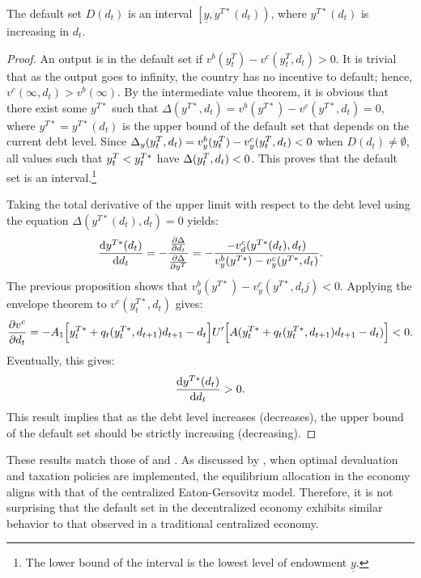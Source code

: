 \begin{proposition}
    \label{prop3}
    The default set $D(d_t)$ is an interval $\left[\underline{y}, y^{T*}(d_t) \right)$, where $y^{T*}(d_t)$ is increasing in $d_t$.
\end{proposition}
\begin{proof}
    An output is in the default set if $v^b(y^T_t) - v^c(y^T_t, d_t) >0$. It is trivial that as the output goes to infinity, the country has no incentive to default; hence, $v^c(\infty, d_t) > v^b(\infty)$. By the intermediate value theorem, it is obvious that there exist some $y^{T*}$ such that $\Delta(y^{T*}, d_t) = v^b(y^{T*}) - v^c(y^{T*}, d_t) = 0$, where $y^{T*} = y^{T*}(d_t)$ is the upper bound of the default set that depends on the current debt level. Since  $\Delta_y(y^T_{t}, d_t) = v^b_y(y^T_{t}) - v^c_y(y^T_t, d_t) < 0$ when $D(d_t) \ne \emptyset$, all values such that  $y^T_{t} < y^{T*}_t$ have $\Delta(y^T_{t}, d_t) <0$. This proves that the default set is an interval.\footnote{%
        The lower bound of the interval is the lowest level of endowment $\underline{y}$.
    }

    Taking the total derivative of the upper limit with respect to the debt level using the equation $\Delta(y^{T*}(d_t), d_t) = 0$ yields:
    \begin{equation*}
        \dv{y^{T*}(d_t)}{d_t} = - \frac{\pdv{\Delta}{d_t}}{\pdv{\Delta}{y^{T}}} = - \frac{-v^c_d(y^{T*}(d_t), d_t)}{v^b_y(y^{T*}) - v^c_y(y^{T*}, d_t)}.
    \end{equation*}
    The previous proposition shows that $v^b_y(y^{T*}) - v^c_y(y^{T*}, d_tj) < 0$. Applying the envelope theorem to $v^c(y^{T*}_t, d_t)$ gives:
    \begin{equation*}
        \pdv{v^c}{d_t} = -A_1\Big[y^{T*}_t + q_t(y^{T*}_t, d_{t+1})d_{t+1} - d_t\Big] U'\Big[A(y^{T*}_t + q_t(y^{T*}_t, d_{t+1})d_{t+1} - d_t)\Big]<0.
    \end{equation*}
    Eventually, this gives:
    \begin{equation}
        \dv{y^{T*}(d_t)}{d_t} > 0.
    \end{equation}
    This result implies that as the debt level increases (decreases), the upper bound of the default set should be strictly increasing (decreasing).
\end{proof}

These results match those of \citet{Arellano-08} and \citet{Uribe-Schmitt-Grohe-textbook}. As discussed by \citet{Na-18}, when optimal devaluation and taxation policies are implemented, the equilibrium allocation in the economy aligns with that of the centralized Eaton-Gersovitz model. Therefore, it is not surprising that the default set in the decentralized economy exhibits similar behavior to that observed in a traditional centralized economy.
